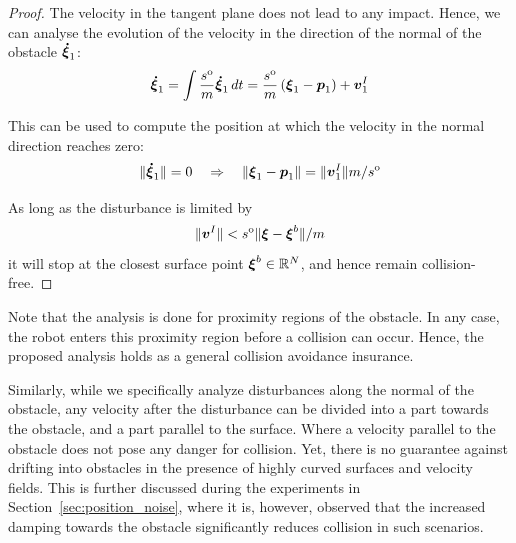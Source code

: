 \begin{proof}

The velocity in the tangent plane does not lead to any impact. Hence, we can analyse the evolution of the velocity in the direction of the normal of the obstacle $\boldsymbol{\dot \xi}_1$:
\begin{equation}
    \vecs{\dot \xi}_1 = \int \frac{s^{\mathrm{o}}}{m} \vecs{ \dot \xi}_1 \, dt = \frac{s^{\mathrm{o}}}{m} \left(\vecs{\xi}_1 - \vect p_1 \right)  + \vecs v^I_1 \label{eq:velocity_with_control}
\end{equation}

This can be used to compute the position at which the velocity in the normal direction reaches zero:
\begin{equation}
    \| \boldsymbol{\dot \xi} _1 \| = 0
    \quad \Rightarrow \quad
    \| \boldsymbol{\xi}_1 -  \boldsymbol{p}_1 \| = \| \boldsymbol{v}^I_1 \| {m} / {s^{\mathrm{o}}} 
\end{equation}

As long as the disturbance is limited by
\begin{equation}
    \| \boldsymbol{v}^I \| < s^{\mathrm{o}} \| \boldsymbol{\xi} - \boldsymbol{\xi}^b \| / m
\end{equation}
it will stop at the closest surface point $\boldsymbol{\xi}^b \in \mathbb{R}^N$, and hence remain collision-free.
\end{proof}

Note that the analysis is done for proximity regions of the obstacle. In any case, the robot enters this proximity region before a collision can occur. Hence, the proposed analysis holds as a general collision avoidance insurance.

Similarly, while we specifically analyze disturbances along the normal of the obstacle, any velocity after the disturbance can be divided into a part towards the obstacle, and a part parallel to the surface. Where a velocity parallel to the obstacle does not pose any danger for collision.
Yet, there is no guarantee against drifting into obstacles in the presence of highly curved surfaces and velocity fields. This is further discussed during the experiments in Section~\ref{sec:position_noise}, where it is, however, observed that the increased damping towards the obstacle significantly reduces collision in such scenarios. 

